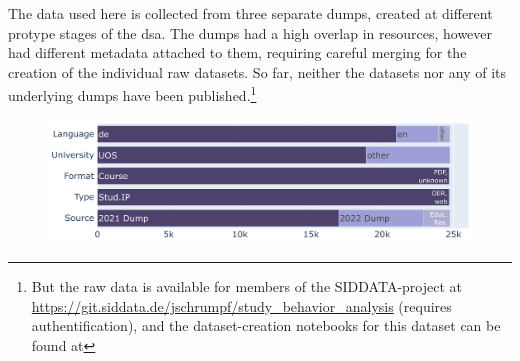 The data used here is collected from three separate dumps, created at different protype stages of the \gls{dsa}. The dumps had a high overlap in resources, however had different metadata attached to them, requiring careful merging for the creation of the individual raw datasets. So far, neither the datasets nor any of its underlying dumps have been published.\footnote{But the raw data is available for members of the SIDDATA-project at \url{https://git.siddata.de/jschrumpf/study_behavior_analysis} (requires authentification), and the dataset-creation notebooks for this dataset can be found at }


\begin{figure}[h]
	\includegraphics[width=1.15\textwidth,center]{graphics/dataset_new/statistics_bars.pdf}
	\label{fig:sid_statistics}
\end{figure}


